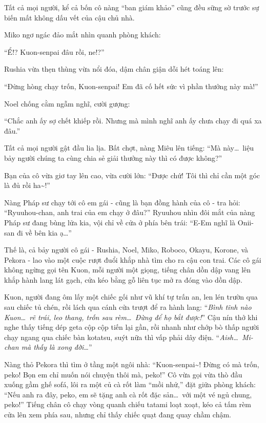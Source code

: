\documentclass[../main.tex]{subfiles}
\begin{document}
Tất cả mọi người, kể cả bốn cô nàng ``ban giám khảo'' cũng đều sững sờ trước sự biến mất không dấu vết của cậu chủ nhà.

Miko ngơ ngác đảo mắt nhìn quanh phòng khách:

``Ể!? Kuon-senpai đâu rồi, ne!?''

Rushia vừa thẹn thùng vừa nổi đóa, dậm chân giận dỗi hét toáng lên:

``Đừng hòng chạy trốn, Kuon-senpai! Em đã cố hết sức vì phần thưởng này mà!''

Noel chống cằm ngẫm nghĩ, cười gượng:

``Chắc anh ấy sợ chết khiếp rồi. Nhưng mà mình nghĩ anh ấy chưa chạy đi quá xa đâu.''

Tất cả mọi người gật đầu lia lịa. Bất chợt, nàng Miêu lên tiếng: ``Mà này\dots\ liệu bảy người chúng ta cùng chia sẻ giải thưởng này thì có được không?''

Bạn của cô vừa giơ tay lên cao, vừa cười lớn: ``Được chứ! Tôi thì chỉ cần một góc là đủ rồi ha\~{}!''

Nàng Pháp sư chạy tới cô em gái - cũng là bạn đồng hành của cô - tra hỏi: ``Ryuuhou-chan, anh trai của em chạy ở đâu?'' Ryuuhou nhìn đôi mắt của nàng Pháp sư đang bùng lửa kia, vội chỉ về cửa ở phía bên trái: ``E-Em nghĩ là Onii-san đi về bên kia ạ\dots''

Thế là, cả bảy người cô gái - Rushia, Noel, Miko, Roboco, Okayu, Korone, và Pekora - lao vào một cuộc rượt đuổi khắp nhà tìm cho ra cậu con trai. Các cô gái không ngừng gọi tên Kuon, mỗi người một giọng, tiếng chân dồn dập vang lên khắp hành lang lát gạch, cửa kéo bằng gỗ liên tục mở ra đóng vào dồn dập.

Kuon, người đang ôm lấy một chiếc gối như vũ khí tự trấn an, len lén trườn qua sau chiếc tủ chén, rồi lách qua cánh cửa trượt để ra hành lang: ``\textit{Bình tĩnh nào Kuon\dots\ rẽ trái, leo thang, trốn sau rèm\dots\ Đừng để họ bắt được!}'' Cậu nín thở khi nghe thấy tiếng dép geta cộp cộp tiến lại gần, rồi nhanh như chớp bò thấp người chạy ngang qua chiếc bàn kotatsu, suýt nữa thì vấp phải dây điện. ``\textit{Aish\dots\ Mi-chan mà thấy là xong đời\dots}''

Nàng thỏ Pekora thì tìm ở tầng một ngôi nhà: ``Kuon-senpai\~{}! Đừng có mà trốn, peko! Bọn em chỉ muốn nói chuyện thôi mà, peko!'' Cô vừa gọi vừa thò đầu xuống gầm ghế sofá, lôi ra một củ cà rốt làm ``mồi nhử,'' đặt giữa phòng khách: ``Nếu anh ra đây, peko, em sẽ tặng anh cà rốt đặc sản\dots\ với một vé ngủ chung, peko!'' Tiếng chân cô chạy vòng quanh chiếu tatami loạt xoạt, kéo cả tấm rèm cửa lên xem phía sau, nhưng chỉ thấy chiếc quạt đang quay chầm chậm.
\end{document}

